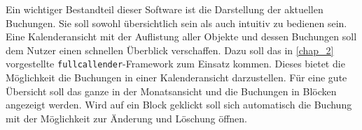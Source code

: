 Ein wichtiger Bestandteil dieser Software ist die Darstellung der aktuellen Buchungen. Sie soll sowohl übersichtlich sein als auch intuitiv zu bedienen sein. Eine Kalenderansicht mit der Auflistung aller Objekte und dessen Buchungen soll dem Nutzer einen schnellen Überblick verschaffen. Dazu soll das in \ref{chap_2} vorgestellte  \texttt{fullcallender}-Framework zum Einsatz kommen. Dieses bietet die Möglichkeit die Buchungen in einer Kalenderansicht darzustellen. Für eine gute Übersicht soll das ganze in der Monatsansicht und die Buchungen in Blöcken angezeigt werden.
Wird auf ein Block geklickt soll sich automatisch die Buchung mit der Möglichkeit zur Änderung und Löschung öffnen. 